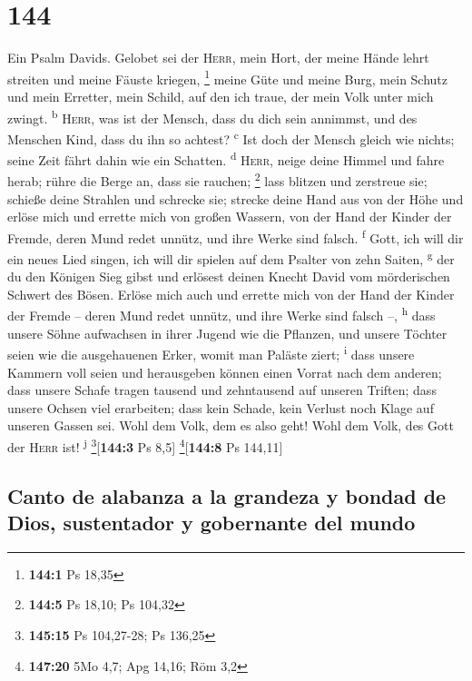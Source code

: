 \hypertarget{section-143}{%
\section{144}\label{section-143}}

 Ein Psalm Davids. Gelobet sei der \textsc{Herr}, mein
Hort, der meine Hände lehrt streiten und meine Fäuste kriegen,
\footnote{\textbf{144:1} Ps 18,35}  meine Güte und meine
Burg, mein Schutz und mein Erretter, mein Schild, auf den ich traue, der
mein Volk unter mich zwingt. \textsuperscript{b} 
\textsc{Herr}, was ist der Mensch, dass du dich sein annimmst, und des
Menschen Kind, dass du ihn so achtest? \textsuperscript{c}
 Ist doch der Mensch gleich wie nichts; seine Zeit fährt
dahin wie ein Schatten. \textsuperscript{d} 
\textsc{Herr}, neige deine Himmel und fahre herab; rühre die Berge an,
dass sie rauchen; \footnote{\textbf{144:5} Ps 18,10; Ps 104,32}
 lass blitzen und zerstreue sie; schieße deine Strahlen
und schrecke sie;  strecke deine Hand aus von der Höhe und
erlöse mich und errette mich von großen Wassern, von der Hand der Kinder
der Fremde,  deren Mund redet unnütz, und ihre Werke sind
falsch. \textsuperscript{f}  Gott, ich will dir ein neues
Lied singen, ich will dir spielen auf dem Psalter von zehn Saiten,
\textsuperscript{g}  der du den Königen Sieg gibst und
erlösest deinen Knecht David vom mörderischen Schwert des Bösen.
 Erlöse mich auch und errette mich von der Hand der
Kinder der Fremde -- deren Mund redet unnütz, und ihre Werke sind falsch
--, \textsuperscript{h}  dass unsere Söhne aufwachsen in
ihrer Jugend wie die Pflanzen, und unsere Töchter seien wie die
ausgehauenen Erker, womit man Paläste ziert; \textsuperscript{i}
 dass unsere Kammern voll seien und herausgeben können
einen Vorrat nach dem anderen; dass unsere Schafe tragen tausend und
zehntausend auf unseren Triften;  dass unsere Ochsen viel
erarbeiten; dass kein Schade, kein Verlust noch Klage auf unseren Gassen
sei.  Wohl dem Volk, dem es also geht! Wohl dem Volk, des
Gott der \textsc{Herr} ist! \textsuperscript{j}
\footnote{\textbf{145:15} Ps 104,27-28; Ps 136,25}{[}\textbf{144:3} Ps
8,5{]} \footnote{\textbf{147:20} 5Mo 4,7; Apg 14,16; Röm 3,2}{[}\textbf{144:8}
Ps 144,11{]}

\hypertarget{canto-de-alabanza-a-la-grandeza-y-bondad-de-dios-sustentador-y-gobernante-del-mundo}{%
\subsection{Canto de alabanza a la grandeza y bondad de Dios,
sustentador y gobernante del
mundo}\label{canto-de-alabanza-a-la-grandeza-y-bondad-de-dios-sustentador-y-gobernante-del-mundo}}

